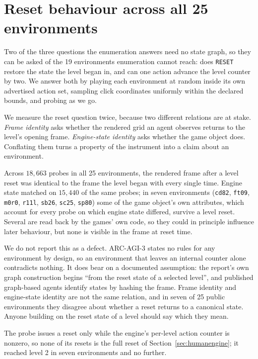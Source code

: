 \documentclass[11pt]{article}
\newcommand{\code}[1]{\texttt{#1}}
\begin{document}
\section{Reset behaviour across all 25 environments}
\label{sec:play}

Two of the three questions the enumeration answers need no state graph, so they
can be asked of the 19 environments enumeration cannot reach: does
\code{RESET} restore the state the level began in, and can one action advance
the level counter by two. We answer both by playing each environment at random
inside its own advertised action set, sampling click coordinates uniformly
within the declared bounds, and probing as we go.

We measure the reset question twice, because two different relations are at
stake. \emph{Frame identity} asks whether the rendered grid an agent observes
returns to the level's opening frame. \emph{Engine-state identity} asks whether
the game object does. Conflating them turns a property of the instrument into a
claim about an environment.

Across $18{,}663$ probes in all 25 environments, the rendered frame after a level
reset was identical to the frame the level began with every single time. Engine
state matched on $15{,}440$ of the same probes; in seven environments
(\code{cd82}, \code{ft09}, \code{m0r0}, \code{r11l}, \code{sb26}, \code{sc25},
\code{sp80}) some of the game object's own attributes, which account for every
probe on which engine state differed, survive a level
reset. Several are read back by the games' own code, so they could in principle
influence later behaviour, but none is visible in the frame at reset time.

We do not report this as a defect. ARC-AGI-3 states no rules for any environment
by design, so an environment that leaves an internal counter alone contradicts
nothing. It does bear on a documented assumption: the report's own graph
construction begins ``from the reset state of a selected level'', and published
graph-based agents identify states by hashing the frame. Frame identity and
engine-state identity are not the same relation, and in seven of 25 public
environments they disagree about whether a reset returns to a canonical state.
Anyone building on the reset state of a level should say which they mean.

The probe issues a reset only while the engine's per-level action counter is
nonzero, so none of its resets is the full reset of Section~\ref{sec:humanengine};
it reached level 2 in seven environments and no further.
\end{document}
